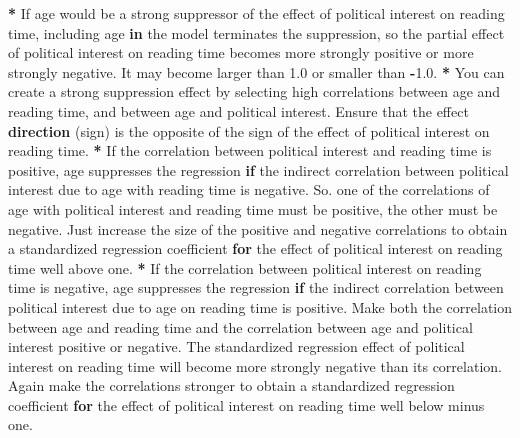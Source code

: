 \documentclass[a4paper]{book}
\newenvironment{Shaded}{\begin{snugshade}}{\end{snugshade}}
\newcommand{\KeywordTok}[1]{\textcolor[rgb]{0,0,0}{\textbf{#1}}}
\newcommand{\FloatTok}[1]{\textcolor[rgb]{0.00,0.00,0.00}{#1}}
\newcommand{\StringTok}[1]{\textcolor[rgb]{0.00,0.00,0.00}{#1}}
\newcommand{\ControlFlowTok}[1]{\textcolor[rgb]{0.00,0.00,0.00}{\textbf{#1}}}
\newcommand{\OperatorTok}[1]{\textcolor[rgb]{0.00,0.00,0.00}{\textbf{#1}}}
\newcommand{\NormalTok}[1]{#1}
\theoremstyle{definition}
\theoremstyle{definition}
\theoremstyle{definition}
\theoremstyle{remark}
\begin{document}
\begin{Shaded}
\begin{Highlighting}[]
\OperatorTok{*}\StringTok{ }\NormalTok{If age would be a strong suppressor of the effect of political interest on}
\NormalTok{reading time, including age }\ControlFlowTok{in}\NormalTok{ the model terminates the suppression, so the}
\NormalTok{partial effect of political interest on reading time becomes more strongly}
\NormalTok{positive or more strongly negative. It may become larger than }\FloatTok{1.0}\NormalTok{ or smaller}
\NormalTok{than }\OperatorTok{-}\FloatTok{1.0}\NormalTok{.}
\OperatorTok{*}\StringTok{ }\NormalTok{You can create a strong suppression effect by selecting high correlations}
\NormalTok{between age and reading time, and between age and political interest. Ensure}
\NormalTok{that the effect }\KeywordTok{direction}\NormalTok{ (sign) is the opposite of the sign of the effect of}
\NormalTok{political interest on reading time.}
\OperatorTok{*}\StringTok{ }\NormalTok{If the correlation between political interest and reading time is positive,}
\NormalTok{age suppresses the regression }\ControlFlowTok{if}\NormalTok{ the indirect correlation between political}
\NormalTok{interest due to age with reading time is negative. So. one of the correlations}
\NormalTok{of age with political interest and reading time must be positive, the other}
\NormalTok{must be negative. Just increase the size of the positive and negative}
\NormalTok{correlations to obtain a standardized regression coefficient }\ControlFlowTok{for}\NormalTok{ the effect of}
\NormalTok{political interest on reading time well above one.}
\OperatorTok{*}\StringTok{ }\NormalTok{If the correlation between political interest on reading time is negative,}
\NormalTok{age suppresses the regression }\ControlFlowTok{if}\NormalTok{ the indirect correlation between political}
\NormalTok{interest due to age on reading time is positive. Make both the correlation}
\NormalTok{between age and reading time and the correlation between age and political}
\NormalTok{interest positive or negative. The standardized regression effect of political}
\NormalTok{interest on reading time will become more strongly negative than its}
\NormalTok{correlation. Again make the correlations stronger to obtain a standardized}
\NormalTok{regression coefficient }\ControlFlowTok{for}\NormalTok{ the effect of political interest on reading time}
\NormalTok{well below minus one.}
\end{Highlighting}
\end{Shaded}
\end{document}
